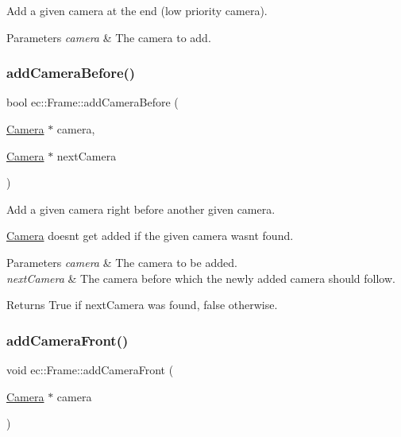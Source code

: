 Add a given camera at the end (low priority camera). 


\begin{DoxyParams}{Parameters}
{\em camera} & The camera to add. \\
\hline
\end{DoxyParams}
\mbox{\label{classec_1_1_frame_af1f1769a61f70a756fd762d80a676063}} 
\subsubsection{\texorpdfstring{add\+Camera\+Before()}{addCameraBefore()}}
{\footnotesize\ttfamily bool ec\+::\+Frame\+::add\+Camera\+Before (\begin{DoxyParamCaption}\item[{\mbox{\hyperlink{classec_1_1_camera}{Camera}} $\ast$}]{camera,  }\item[{\mbox{\hyperlink{classec_1_1_camera}{Camera}} $\ast$}]{next\+Camera }\end{DoxyParamCaption})}



Add a given camera right before another given camera. 

\mbox{\hyperlink{classec_1_1_camera}{Camera}} doesn\textquotesingle{}t get added if the given camera wasn\textquotesingle{}t found. 
\begin{DoxyParams}{Parameters}
{\em camera} & The camera to be added. \\
\hline
{\em next\+Camera} & The camera before which the newly added camera should follow. \\
\hline
\end{DoxyParams}
\begin{DoxyReturn}{Returns}
True if next\+Camera was found, false otherwise. 
\end{DoxyReturn}
\mbox{\label{classec_1_1_frame_abcbaa8a587c8ad75173aacaa853bc5b2}} 
\subsubsection{\texorpdfstring{add\+Camera\+Front()}{addCameraFront()}}
{\footnotesize\ttfamily void ec\+::\+Frame\+::add\+Camera\+Front (\begin{DoxyParamCaption}\item[{\mbox{\hyperlink{classec_1_1_camera}{Camera}} $\ast$}]{camera }\end{DoxyParamCaption})}



